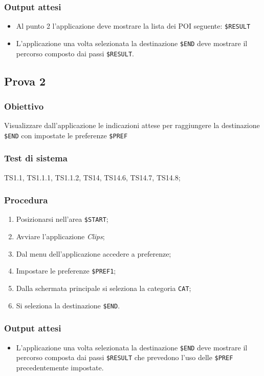 \documentclass[../Sperimentazione.tex]{subfiles}
\begin{document}
	\subsubsection{Output attesi}
		\begin{itemize}
		\item Al punto 2 l'applicazione deve mostrare la lista dei POI seguente:  \verb|$RESULT|
		\item L'applicazione una volta selezionata la destinazione  \verb|$END| deve mostrare il percorso composto dai passi  \verb|$RESULT|.
		\end{itemize}
		
	
\newpage		
\subsection{Prova 2} %
\label{subsec:Prova2}
	
	\subsubsection{Obiettivo}
		Visualizzare dall'applicazione le indicazioni attese per raggiungere la destinazione  \verb|$END| con impostate le preferenze  \verb|$PREF|
		
	\subsubsection{Test di sistema}
		TS1.1, TS1.1.1, TS1.1.2,
		TS14, TS14.6, TS14.7, TS14.8;
		
		
	\subsubsection{Procedura}
		\begin{enumerate}
		\item Posizionarsi nell'area \verb|$START|;
		\item Avviare l'applicazione \textit{Clips};
		\item Dal menu dell'applicazione accedere a preferenze;
		\item Impostare le preferenze  \verb|$PREF1|;
		\item Dalla schermata principale si seleziona la categoria  \verb|CAT|;
		\item Si seleziona la destinazione  \verb|$END|.
		\end{enumerate}
		
	\subsubsection{Output attesi}
		\begin{itemize}
		\item L'applicazione una volta selezionata la destinazione  \verb|$END| deve mostrare il percorso composta dai passi  \verb|$RESULT| che prevedono l'uso delle \verb|$PREF| precedentemente impostate.
		\end{itemize}
		
\end{document}
